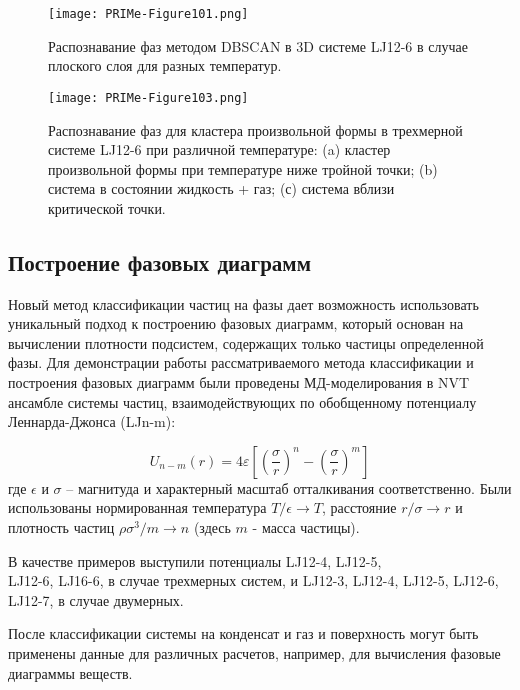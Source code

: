 \begin{figure}[!t]
    \centering
    \texttt{[image: PRIMe-Figure101.png]}
    \caption{Распознавание фаз методом DBSCAN в 3D системе LJ12-6 в случае плоского слоя для разных температур.}
    \label{D3_flat_layer}
\end{figure}


\begin{figure}[!t]
    \centering
    \texttt{[image: PRIMe-Figure103.png]}
    \caption{Распознавание фаз для кластера произвольной формы в трехмерной системе LJ12-6 при различной температуре: (a) кластер произвольной формы при температуре ниже тройной точки; (b) система в состоянии жидкость + газ; (с) система вблизи критической точки.}
    \label{D3_free_conf}
\end{figure}



\subsection{Построение фазовых диаграмм}
\label{PRIMe-SubSecPhaseDiagram}

Новый метод классификации частиц на фазы дает возможность использовать уникальный подход к построению фазовых диаграмм, который основан на вычислении плотности подсистем, содержащих только частицы определенной фазы.
Для демонстрации работы рассматриваемого метода классификации и построения фазовых диаграмм были проведены МД-моделирования в NVT ансамбле системы частиц, взаимодействующих по обобщенному потенциалу Леннарда-Джонса (LJn-m):

\begin{equation}
U_{n-m}(r)=4 \varepsilon\left[\left(\frac{\sigma}{r}\right)^{n}-\left(\frac{\sigma}{r}\right)^{m}\right]
\label{MACR-eq1}
\end{equation}
где $\epsilon$ и $\sigma$ -- магнитуда и характерный масштаб отталкивания соответственно.
Были использованы нормированная температура $ T/ \epsilon \rightarrow T $, расстояние $ r/ \sigma \rightarrow r $ и плотность частиц $ \rho \sigma ^ 3 / m \rightarrow n$ (здесь $ m $ - масса частицы). 

В качестве примеров выступили потенциалы LJ12-4, LJ12-5, \\ LJ12-6, LJ16-6, в случае трехмерных систем, и LJ12-3, LJ12-4, LJ12-5, LJ12-6, LJ12-7, в случае двумерных.

После классификации системы на конденсат и газ и поверхность могут быть применены данные для различных расчетов, например, для вычисления фазовые диаграммы веществ.

